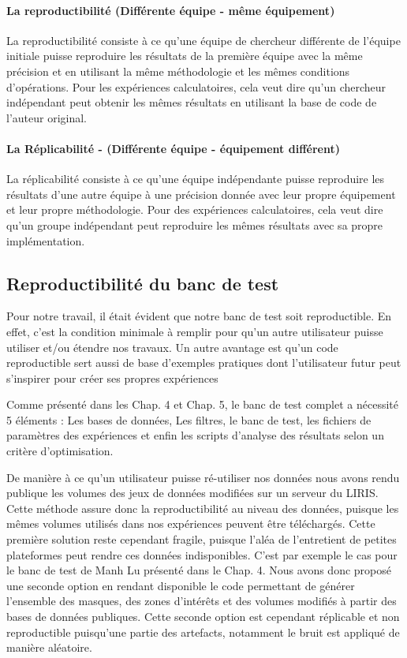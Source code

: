 \paragraph{La reproductibilité (Différente équipe - même équipement)}

La reproductibilité consiste à ce qu'une équipe de chercheur différente de l'équipe initiale puisse reproduire les résultats de la première équipe avec la même précision et en utilisant la même méthodologie et les mêmes conditions d'opérations. Pour les expériences calculatoires, cela veut dire qu'un chercheur indépendant peut obtenir les mêmes résultats en utilisant la base de code de l'auteur original.

\paragraph{La Réplicabilité - (Différente équipe - équipement différent) }

La réplicabilité consiste à ce qu'une équipe indépendante puisse reproduire les résultats d'une autre équipe à une précision donnée avec leur propre équipement et leur propre méthodologie. Pour des expériences calculatoires, cela veut dire qu'un groupe indépendant peut reproduire les mêmes résultats avec sa propre implémentation.

\subsection{Reproductibilité du banc de test}

Pour notre travail, il était évident que notre banc de test soit reproductible. En effet, c'est la condition minimale à remplir pour qu'un autre utilisateur puisse utiliser et/ou étendre nos travaux. Un autre avantage est qu'un code reproductible sert aussi de base d'exemples pratiques dont l'utilisateur futur peut s'inspirer pour créer ses propres expériences

Comme présenté dans les Chap. 4 et Chap. 5, le banc de test complet a nécessité 5 éléments : Les bases de données, Les filtres, le banc de test, les fichiers de paramètres des expériences et enfin les scripts d'analyse des résultats selon un critère d'optimisation.

De manière à ce qu'un utilisateur puisse ré-utiliser nos données nous avons rendu publique les volumes des jeux de données modifiées sur un serveur du LIRIS. Cette méthode assure donc la reproductibilité au niveau des données, puisque les mêmes volumes utilisés dans nos expériences peuvent être téléchargés. Cette première solution reste cependant fragile, puisque l'aléa de l'entretient de petites plateformes peut rendre ces données indisponibles. C'est par exemple le cas pour le banc de test de Manh Lu présenté dans le Chap. 4. Nous avons donc proposé une seconde option en rendant disponible le code permettant de générer l'ensemble des masques, des zones d'intérêts et des volumes modifiés à partir des bases de données publiques. Cette seconde option est cependant réplicable et non reproductible puisqu'une partie des artefacts, notamment le bruit est appliqué de manière aléatoire.

